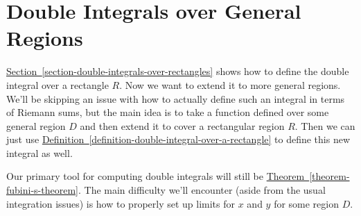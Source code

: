 \documentclass[10pt,]{book}
\numberwithin{equation}{section}
\begin{document}
\section[{Double Integrals over General Regions}]{Double Integrals over General Regions}\label{section-double-integrals-over-general-regions}
\begin{conclusion}{}%
\hypertarget{p-1470}{}%
\hyperref[section-double-integrals-over-rectangles]{Section~\ref{section-double-integrals-over-rectangles}} shows how to define the double integral over a rectangle \(R\). Now we want to extend it to more general regions. We'll be skipping an issue with how to actually define such an integral in terms of Riemann sums, but the main idea is to take a function defined over some general region \(D\) and then extend it to cover a rectangular region \(R\). Then we can just use \hyperref[definition-double-integral-over-a-rectangle]{Definition~\ref{definition-double-integral-over-a-rectangle}} to define this new integral as well.%
\par
\hypertarget{p-1471}{}%
Our primary tool for computing double integrals will still be \hyperref[theorem-fubini-s-theorem]{Theorem~\ref{theorem-fubini-s-theorem}}. The main difficulty we'll encounter (aside from the usual integration issues) is how to properly set up limits for \(x\) and \(y\) for some region \(D\).%
\end{conclusion}%
\end{document}
